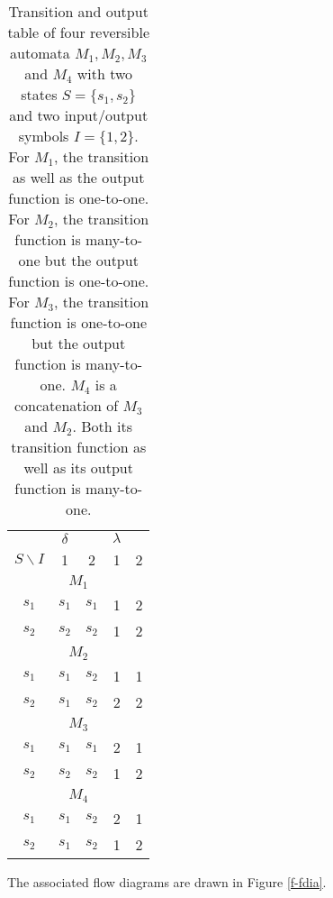 \begin{table}
\begin{center}
\begin{tabular}{|c|cc|cc|}
 \hline\hline
 &$\delta$ & & $\lambda$&\\
$S\backslash I$ &1&2& 1&2\\
 \hline\hline
\multicolumn{5}{|c|}{$M_1$}\\
 \hline
$s_1$&$s_1$&$s_1$ & 1&2\\
$s_2$&$s_2$&$s_2 $& 1&2\\
 \hline\hline
\multicolumn{5}{|c|}{$M_2$}\\
 \hline
$s_1$&$s_1$&$s_2$ & 1&1\\
$s_2$&$s_1$&$s_2 $& 2&2\\
 \hline\hline
\multicolumn{5}{|c|}{$M_3$}\\
 \hline
$s_1$&$s_1$&$s_1$ & 2&1\\
$s_2$&$s_2$&$s_2 $& 1&2\\
 \hline\hline
\multicolumn{5}{|c|}{$M_4$}\\
 \hline
$s_1$&$s_1$&$s_2$ & 2&1\\
$s_2$&$s_1$&$s_2 $& 1&2\\
 \hline\hline
\end{tabular}
\end{center}
\caption{Transition and output table of four reversible
automata $M_1,M_2,M_3$ and $M_4$ with two states $S=\{s_1, s_2\}$ and two
input/output symbols $I= \{1,2\}$.
For $M_1$, the transition as well as the output function is one-to-one.
For $M_2$, the transition function is many-to-one but the output
function is one-to-one.
For $M_3$, the transition function is one-to-one but the output
function is many-to-one.
$M_4$ is a concatenation of $M_3$ and $M_2$. Both its transition
function as well as its output function is many-to-one.
\label{t-ra}}
\end{table}
The associated flow diagrams are drawn in Figure \ref{f-fdia}.

